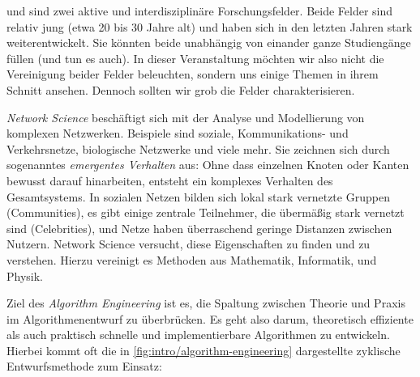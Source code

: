  und  sind zwei aktive und interdisziplinäre Forschungsfelder.
Beide Felder sind relativ jung (etwa 20 bis 30 Jahre alt) und haben sich in den letzten Jahren stark weiterentwickelt.
Sie könnten beide unabhängig von einander ganze Studiengänge füllen (und tun es auch).
In dieser Veranstaltung möchten wir also nicht die Vereinigung beider Felder beleuchten, sondern uns einige Themen in ihrem Schnitt ansehen.
Dennoch sollten wir grob die Felder charakterisieren.

\emph{Network Science} beschäftigt sich mit der Analyse und Modellierung von komplexen Netzwerken.
Beispiele sind soziale, Kommunikations- und Verkehrsnetze, biologische Netzwerke und viele mehr.
Sie zeichnen sich durch sogenanntes \emph{emergentes Verhalten} aus: Ohne dass einzelnen Knoten oder Kanten bewusst darauf hinarbeiten, entsteht ein komplexes Verhalten des Gesamtsystems.
In sozialen Netzen bilden sich \zB lokal stark vernetzte Gruppen (Communities), es gibt einige zentrale Teilnehmer, die übermäßig stark vernetzt sind (Celebrities), und Netze haben überraschend geringe Distanzen zwischen Nutzern.
Network Science versucht, diese Eigenschaften zu finden und zu verstehen.
Hierzu vereinigt es Methoden aus Mathematik, Informatik, und Physik.

\vspace{-2em}
Ziel des \emph{Algorithm Engineering} ist es, die Spaltung zwischen Theorie und Praxis im Algorithmenentwurf zu überbrücken.
Es geht also darum, theoretisch effiziente als auch praktisch schnelle und implementierbare Algorithmen zu entwickeln.
Hierbei kommt oft die in \cref{fig:intro/algorithm-engineering} dargestellte zyklische Entwurfsmethode zum Einsatz:

